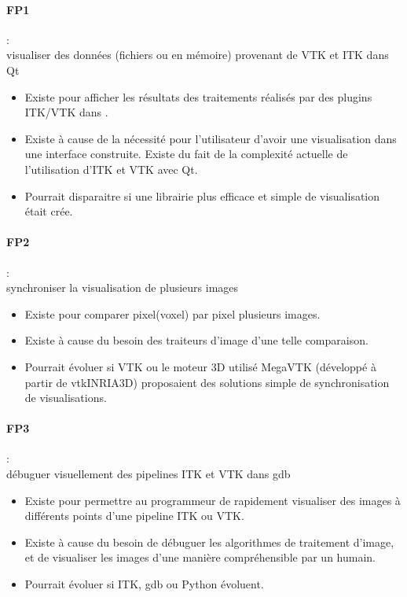 \paragraph*{FP1} :\\ visualiser des données (fichiers ou en mémoire) provenant de VTK et ITK dans Qt
\begin{itemize}
  \item Existe pour afficher les résultats des traitements réalisés par des plugins ITK/VTK dans {\gofigure}.
  \item Existe à cause de la nécessité pour l'utilisateur d'avoir une visualisation dans une interface construite.
  Existe du fait de la complexité actuelle de l'utilisation d'ITK et VTK avec Qt. 
  \item Pourrait disparaitre si une librairie plus efficace et simple de visualisation était crée.
\end{itemize}

\paragraph*{FP2} :\\ synchroniser la visualisation de plusieurs images
\begin{itemize}
  \item Existe pour comparer pixel(voxel) par pixel plusieurs images.
  \item Existe à cause du besoin des traiteurs d'image d'une telle comparaison.
  \item Pourrait évoluer si VTK ou le moteur 3D utilisé MegaVTK (développé à partir de vtkINRIA3D\cite{vtkINRIA})
  proposaient des solutions simple de synchronisation de visualisations.
\end{itemize}

\paragraph*{FP3} :\\ débuguer visuellement des pipelines ITK et VTK dans gdb
\begin{itemize}
  \item Existe pour permettre au programmeur de rapidement visualiser des images
   à différents points d'une pipeline ITK ou VTK.
  \item Existe à cause du besoin de débuguer les algorithmes de traitement d'image,
  et de visualiser les images d'une manière compréhensible par un humain.
  \item Pourrait évoluer si ITK, gdb ou Python évoluent.
\end{itemize}

